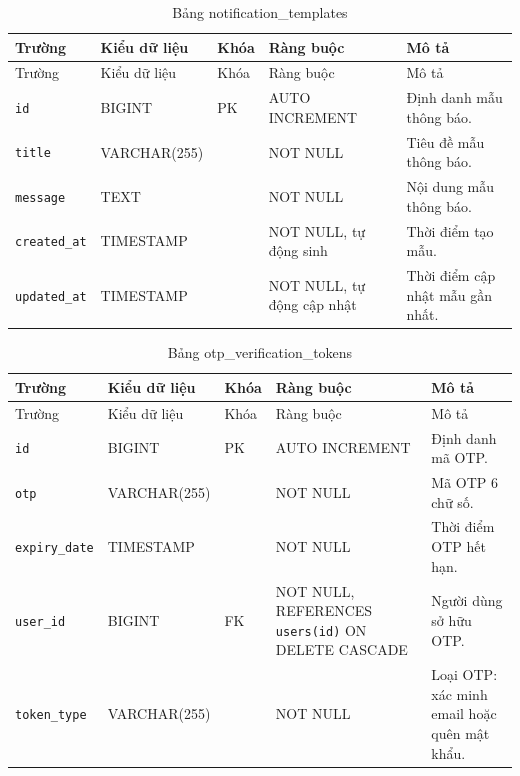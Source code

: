 ﻿\documentclass[12pt,a4paper]{report}
\begin{document}
\begin{longtable}{L{4.2cm} L{2.15cm} L{0.75cm} L{3.05cm} L{4.0cm}}
\caption{Bảng notification\_templates}\label{tab:db-notification-templates}\\
\toprule
Trường & Kiểu dữ liệu & Khóa & Ràng buộc & Mô tả \\
\midrule
\endfirsthead
\toprule Trường & Kiểu dữ liệu & Khóa & Ràng buộc & Mô tả \\\midrule
\endhead
\texttt{id} & BIGINT & PK & AUTO INCREMENT & Định danh mẫu thông báo. \\
\texttt{title} & VARCHAR(255) & & NOT NULL & Tiêu đề mẫu thông báo. \\
\texttt{message} & TEXT & & NOT NULL & Nội dung mẫu thông báo. \\
\texttt{created\_at} & TIMESTAMP & & NOT NULL, tự động sinh & Thời điểm tạo mẫu. \\
\texttt{updated\_at} & TIMESTAMP & & NOT NULL, tự động cập nhật & Thời điểm cập nhật mẫu gần nhất. \\
\bottomrule
\end{longtable}

\begin{longtable}{L{4.2cm} L{2.15cm} L{0.75cm} L{3.05cm} L{4.0cm}}
\caption{Bảng otp\_verification\_tokens}\label{tab:db-otp-tokens}\\
\toprule
Trường & Kiểu dữ liệu & Khóa & Ràng buộc & Mô tả \\
\midrule
\endfirsthead
\toprule Trường & Kiểu dữ liệu & Khóa & Ràng buộc & Mô tả \\\midrule
\endhead
\texttt{id} & BIGINT & PK & AUTO INCREMENT & Định danh mã OTP. \\
\texttt{otp} & VARCHAR(255) & & NOT NULL & Mã OTP 6 chữ số. \\
\texttt{expiry\_date} & TIMESTAMP & & NOT NULL & Thời điểm OTP hết hạn. \\
\texttt{user\_id} & BIGINT & FK & NOT NULL, REFERENCES \texttt{users(id)} ON DELETE CASCADE & Người dùng sở hữu OTP. \\
\texttt{token\_type} & VARCHAR(255) & & NOT NULL & Loại OTP: xác minh email hoặc quên mật khẩu. \\
\bottomrule
\end{longtable}
\end{document}
